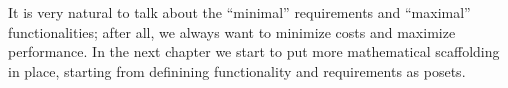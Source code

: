 It is very natural to talk about the ``minimal'' requirements and ``maximal'' functionalities;
after all, we always want to minimize costs and maximize performance. In the next chapter
we start to put more mathematical scaffolding in place, starting from definining functionality
and requirements as posets.


